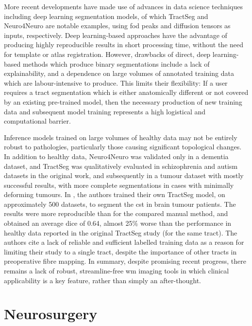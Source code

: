 \documentclass[12pt,phd,a4paper,twoside]{ucl_thesis}
\renewcommand{\textcite}[2][]{
\ifthenelse { \equal {#1} {} }  {\citeauthor{#2}\autocite{#2}}   {\citeauthor{#1}\autocite{#2}}}
\begin{document}
More recent developments have made use of advances in data science techniques including deep learning segmentation models, of which TractSeg\autocite{Wasserthal2018} and Neuro4Neuro\autocite{Li2020} are notable examples, using \gls{fod} peaks and diffusion tensors as inputs, respectively.
Deep learning-based approaches have the advantage of producing highly reproducible results in short processing time, without the need for template or atlas registration.
However, drawbacks of direct, deep learning-based methods which produce binary segmentations include a lack of explainability, and a dependence on large volumes of annotated training data which are labour-intensive to produce.
This limits their flexibility:
If a user requires a tract segmentation which is either anatomically different or not covered by an existing pre-trained model, then the necessary production of new training data and subsequent model training represents a high logistical and computational barrier.

Inference models trained on large volumes of healthy data may not be entirely robust to pathologies, particularly those causing significant topological changes.
In addition to healthy data, Neuro4Neuro\autocite{Li2020} was validated only in a dementia dataset, and TractSeg\autocite{Wasserthal2018} was qualitatively evaluated in schizophrenia and autism datasets in the original work, and subsequently in a tumour dataset with mostly successful results, with more complete segmentations in cases with minimally deforming tumours\autocite{Richards2021}.
In \textcite{Moshe2022}, the authors trained their own TractSeg model, on approximately 500 datasets, to segment the \gls{cst} in brain tumour patients.
The results were more reproducible than for the compared manual method, and obtained an average \gls{dice} of 0.64, almost 25\% worse than the performance in healthy data reported in the original TractSeg study (for the same tract).
The authors cite a lack of reliable and sufficient labelled training data as a reason for limiting their study to a single tract, despite the importance of other tracts in preoperative fibre mapping.
In summary, despite promising recent progress, there remains a lack of robust, streamline-free \gls{wm} imaging tools in which clinical applicability is a key feature, rather than simply an after-thought.
\clearpage{}
\clearpage{}
\chapter{Neurosurgery}\label{chap:neurosurgery}
\end{document}
